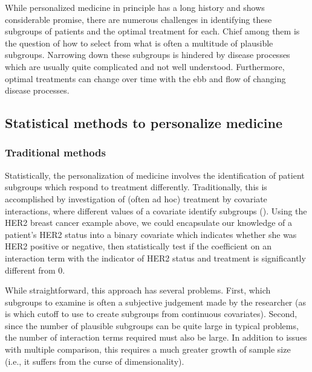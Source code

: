 \documentclass[12pt]{article}
\begin{document}
While personalized medicine in principle has a long history and shows considerable promise, there are numerous challenges in identifying these subgroups of patients and the optimal treatment for each. Chief among them is the question of how to select from what is often a multitude of plausible subgroups. Narrowing down these subgroups is hindered by disease processes which are usually quite complicated and not well understood. Furthermore, optimal treatments can change over time with the ebb and flow of changing disease processes.


\subsection{Statistical methods to personalize medicine} %
\label{sub:statistical_methods_to_personalize_medicine}


\subsubsection{Traditional methods} %
\label{ssub:traditional_methods}


Statistically, the personalization of medicine involves the identification of patient subgroups which respond to treatment differently. Traditionally, this is accomplished by investigation of (often ad hoc) treatment by covariate interactions, where different values of a covariate identify subgroups (\cite{Byar1985}). Using the HER2 breast cancer example above, we could encapsulate our knowledge of a patient's HER2 status into a binary covariate which indicates whether she was HER2 positive or negative, then statistically test if the coefficient on an interaction term with the indicator of HER2 status and treatment is significantly different from 0.


While straightforward, this approach has several problems. First, which subgroups to examine is often a subjective judgement made by the researcher (as is which cutoff to use to create subgroups from continuous covariates). Second, since the number of plausible subgroups can be quite large in typical problems, the number of interaction terms required must also be large. In addition to issues with multiple comparison, this requires a much greater growth of sample size (i.e., it suffers from the curse of dimensionality).
\end{document}
